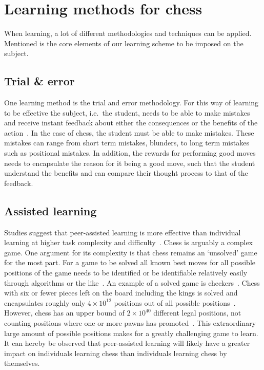 \section{Learning methods for chess}\label{sec:learning-methods-for-chess}

When learning, a lot of different methodologies and techniques can be applied.
Mentioned is the core elements of our learning scheme to be imposed on the subject.

\subsection{Trial \& error}\label{subsec:trial-and-error}

One learning method is the trial and error methodology.
For this way of learning to be effective the subject, i.e.\ the student, needs to be able to make mistakes and receive
instant feedback about either the consequences or the benefits of the action~\cite{li2023}.
In the case of chess, the student must be able to make mistakes.
These mistakes can range from short term mistakes, blunders, to long term mistakes such as positional mistakes.
In addition, the rewards for performing good moves needs to encapsulate the reason for it being a good move, such that
the student understand the benefits and can compare their thought process to that of the feedback.

\subsection{Assisted learning}\label{subsec:assisted-learning}

Studies suggest that peer-assisted learning is more effective than individual learning at higher task complexity and
difficulty~\cite{carson2023}.
Chess is arguably a complex game.
One argument for its complexity is that chess remains an `unsolved' game for the most part.
For a game to be solved all known best moves for all possible positions of the game needs to be identified or be
identifiable relatively easily through algorithms or the like~\cite{herik2002}.
An example of a solved game is checkers~\cite{schaeffer2007}.
Chess with six or fewer pieces left on the board including the kings is solved and encapsulates roughly only
\( 4 \times 10^{12} \) positions out of all possible positions~\cite{syzygy2024}.
However, chess has an upper bound of \( 2 \times 10^{40} \) different legal positions, not counting positions where one
or more pawns has promoted~\cite{steinerberger2014}.
This extraordinary large amount of possible positions makes for a greatly challenging game to learn.
It can hereby be observed that peer-assisted learning will likely have a greater impact on individuals learning chess
than individuals learning chess by themselves.

